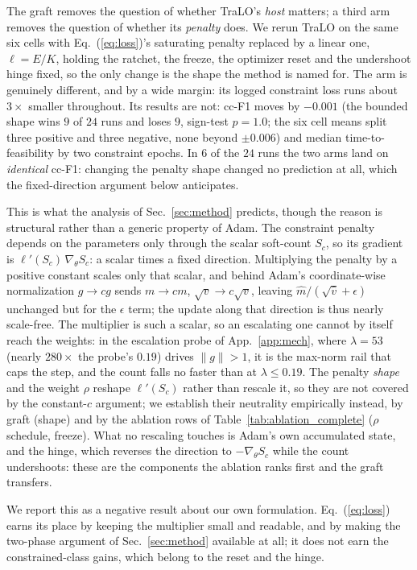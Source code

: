 \documentclass[10pt]{article}
\begin{document}
The graft removes the question of whether TraLO's \emph{host} matters; a
third arm removes the question of whether its \emph{penalty} does. We
rerun TraLO on the same six cells with Eq.~(\ref{eq:loss})'s saturating
penalty replaced by a linear one, $\ell = E/K$, holding the ratchet, the
freeze, the optimizer reset and the undershoot hinge fixed, so the only
change is the shape the method is named for. The arm is genuinely
different, and by a wide margin: its logged constraint loss runs about
$3\times$ smaller throughout. Its results are not: cc-F1 moves by
$-0.001$ (the bounded shape wins $9$ of $24$ runs and loses $9$,
sign-test $p{=}1.0$; the six cell means split three positive and three
negative, none beyond $\pm0.006$) and median time-to-feasibility by two
constraint epochs. In $6$ of the $24$ runs the two arms land on
\emph{identical} cc-F1: changing the penalty shape changed no
prediction at all, which the fixed-direction argument below anticipates.

This is what the analysis of Sec.~\ref{sec:method} predicts, though the
reason is structural rather than a generic property of Adam. The
constraint penalty depends on the parameters only through the scalar
soft-count $S_c$, so its gradient is $\ell'(S_c)\,\nabla_\theta S_c$: a
scalar times a fixed direction. Multiplying the penalty by a positive
constant scales only that scalar, and behind Adam's coordinate-wise
normalization $g\!\to\!cg$ sends $m\!\to\!cm$, $\sqrt{v}\!\to\!c\sqrt{v}$,
leaving $\hat m/(\sqrt{\hat v}+\epsilon)$ unchanged but for the
$\epsilon$ term; the update along that direction is thus nearly
scale-free. The multiplier is such a scalar, so an escalating one
cannot by itself reach the weights: in the escalation probe of
App.~\ref{app:mech}, where $\lambda{=}53$ (nearly $280\times$ the
probe's $0.19$) drives $\|g\|{>}1$, it is the max-norm rail that caps
the step, and the count falls no faster than at $\lambda\!\le\!0.19$.
The penalty \emph{shape} and the weight $\rho$ reshape $\ell'(S_c)$
rather than rescale it, so they are not covered by the constant-$c$
argument; we establish their neutrality empirically instead, by graft
(shape) and by the ablation rows of Table~\ref{tab:ablation_complete}
($\rho$ schedule, freeze). What no rescaling touches is Adam's own
accumulated state, and the hinge, which reverses the direction to
$-\nabla_\theta S_c$ while the count undershoots: these are the
components the ablation ranks first and the graft transfers.

We report this as a negative result about our own formulation.
Eq.~(\ref{eq:loss}) earns its place by keeping the multiplier small and
readable, and by making the two-phase argument of Sec.~\ref{sec:method}
available at all; it does not earn the constrained-class gains, which
belong to the reset and the hinge.
\end{document}
